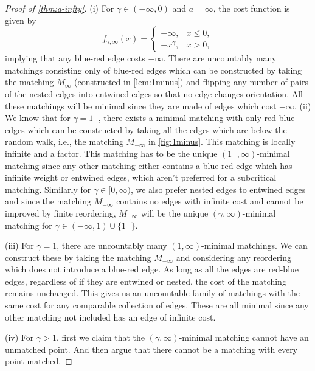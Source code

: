 \documentclass{article}
\begin{document}
\begin{proof}[Proof of \cref{thm:a-infty}]
  (i) For $\gamma\in(-\infty,0)$ and $a=\infty$, the cost function
  is given by
  \[ f_{\gamma,\infty} (x) =
    \begin{cases}
      -\infty, & x\leq 0, \\
      -x^\gamma, & x>0,
    \end{cases}
  \]
  implying that any blue-red edge costs $-\infty$. There are
  uncountably many matchings consisting only of blue-red edges which
  can be constructed by taking the matching $M_\infty$ (constructed in
  \cref{lem:1minus}) and flipping any number of pairs of the nested
  edges into entwined edges so that no edge changes orientation. All
  these matchings will be minimal since they are made of edges which
  cost $-\infty$.
(ii)   We know that for $\gamma=1^-$, there exists a minimal matching
  with only red-blue edges which can be constructed by taking all the
  edges which are below the random walk, i.e., the matching
  $M_{-\infty}$ in \cref{fig:1minus}.   This matching is locally
  infinite and a factor.
  This matching has to be the unique $(1^-,\infty)$-minimal matching since
  any other matching either contains a blue-red edge which has
  infinite weight or entwined edges, which aren't preferred for a
  subcritical matching. Similarly for $\gamma\in[0,\infty)$, we also prefer
  nested edges to entwined edges and since the matching $M_{-\infty}$ contains no
  edges with infinite cost and cannot be improved by finite
  reordering, $M_{-\infty}$ will be the unique $(\gamma,\infty)$-minimal
  matching for $\gamma\in(-\infty,1)\cup\{1^-\}$.

(iii) For $\gamma=1$,
there are uncountably many $(1,\infty)$-minimal
 matchings.  We can construct these
 by taking the matching $M_{-\infty}$ and considering any reordering
 which does not introduce a blue-red edge. As long as all the edges
 are red-blue edges, regardless of if they are entwined or nested, the
 cost of the matching remains unchanged. This gives us an uncountable
 family of matchings with the same cost for any comparable
 collection of edges. These are all minimal since any other matching
 not included has an edge of infinite cost.


  (iv) For $\gamma>1$, first we claim that the $(\gamma,\infty)$-minimal
  matching cannot have an unmatched point. And then argue that there
  cannot be a matching with every point matched.


\end{proof}
\end{document}
